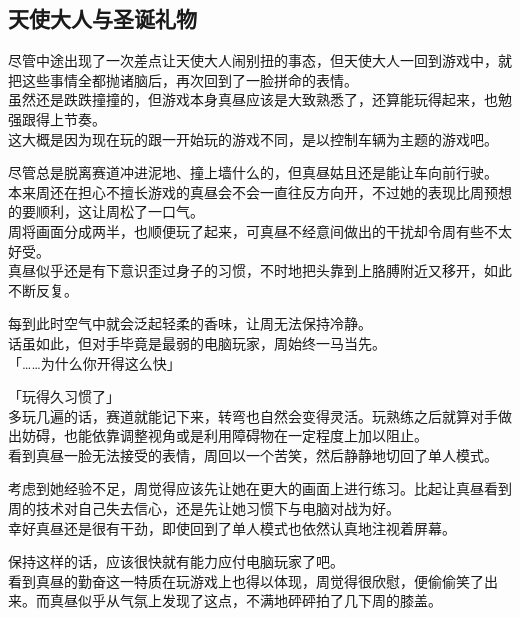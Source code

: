\subsection{天使大人与圣诞礼物}

尽管中途出现了一次差点让天使大人闹别扭的事态，但天使大人一回到游戏中，就把这些事情全都抛诸脑后，再次回到了一脸拼命的表情。\\

虽然还是跌跌撞撞的，但游戏本身真昼应该是大致熟悉了，还算能玩得起来，也勉强跟得上节奏。\\

这大概是因为现在玩的跟一开始玩的游戏不同，是以控制车辆为主题的游戏吧。

尽管总是脱离赛道冲进泥地、撞上墙什么的，但真昼姑且还是能让车向前行驶。\\

本来周还在担心不擅长游戏的真昼会不会一直往反方向开，不过她的表现比周预想的要顺利，这让周松了一口气。\\

周将画面分成两半，也顺便玩了起来，可真昼不经意间做出的干扰却令周有些不太好受。\\

真昼似乎还是有下意识歪过身子的习惯，不时地把头靠到上胳膊附近又移开，如此不断反复。

每到此时空气中就会泛起轻柔的香味，让周无法保持冷静。\\

话虽如此，但对手毕竟是最弱的电脑玩家，周始终一马当先。\\

「……为什么你开得这么快」

「玩得久习惯了」\\

多玩几遍的话，赛道就能记下来，转弯也自然会变得灵活。玩熟练之后就算对手做出妨碍，也能依靠调整视角或是利用障碍物在一定程度上加以阻止。\\

看到真昼一脸无法接受的表情，周回以一个苦笑，然后静静地切回了单人模式。

考虑到她经验不足，周觉得应该先让她在更大的画面上进行练习。比起让真昼看到周的技术对自己失去信心，还是先让她习惯下与电脑对战为好。\\

幸好真昼还是很有干劲，即使回到了单人模式也依然认真地注视着屏幕。

保持这样的话，应该很快就有能力应付电脑玩家了吧。\\

看到真昼的勤奋这一特质在玩游戏上也得以体现，周觉得很欣慰，便偷偷笑了出来。而真昼似乎从气氛上发现了这点，不满地砰砰拍了几下周的膝盖。

